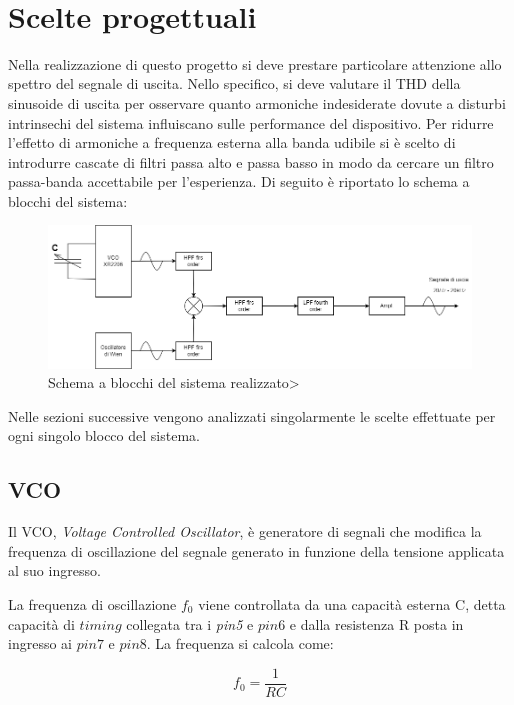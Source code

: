 \documentclass[titlepage]{report}
\begin{document}
\

\chapter{Scelte progettuali}
	\label{ch:scelte}
	
	Nella realizzazione di questo progetto si deve prestare particolare attenzione allo spettro del segnale di uscita. Nello specifico, si deve valutare il THD della sinusoide di uscita per osservare quanto armoniche indesiderate dovute a disturbi intrinsechi del sistema influiscano sulle performance del dispositivo.
	Per ridurre l'effetto di armoniche a frequenza esterna alla banda udibile si è scelto di introdurre cascate di filtri passa alto e passa basso in modo da cercare un filtro passa-banda accettabile per l'esperienza. Di seguito è riportato lo schema a blocchi del sistema:

	\begin{figure}[h]
		\centering
		\includegraphics[scale=0.5]{Immagini/Schema a blocchi PSEA.png}
		\caption{Schema a blocchi del sistema realizzato>}
		\label{<fig: Schema a blocchi finale>}
	\end{figure}
\space
	\noindent Nelle sezioni successive vengono analizzati singolarmente le scelte effettuate per ogni singolo blocco del sistema.
	 
\section{VCO}

	Il VCO, \textit{Voltage Controlled Oscillator}, è generatore di segnali che modifica la frequenza di oscillazione del segnale generato in funzione della tensione applicata al suo ingresso.
	
	\noindent La frequenza di oscillazione $f_0$ viene controllata da una capacità esterna C, detta capacità di $timing$ collegata tra i \textit{pin5} e $pin6$ e dalla resistenza R posta in ingresso ai $pin7$ e $pin8$. La frequenza si calcola come:
	
	\begin{equation}
		\label{eq:freq_operation}
		f_0 = \frac{1}{RC} 
	\end{equation}
\end{document}
